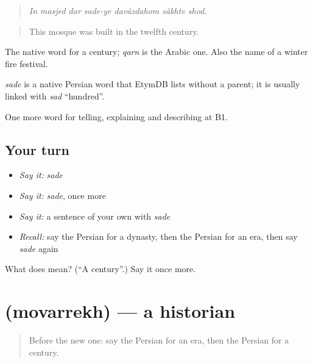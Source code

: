 \begin{quote}
\emph{In masjed dar sade-ye davâzdahom sâkhte shod.}
\end{quote}

\begin{quote}
This mosque was built in the twelfth century.
\end{quote}

The native word for a century; \emph{qarn} is the Arabic one. Also the name of a winter fire festival.

\begin{cousinweb}
\emph{sade} is a native Persian word that EtymDB lists without a parent; it is usually linked with \emph{sad} \textquotedblleft{}hundred\textquotedblright{}.
\end{cousinweb}

\begin{grammarlens}[title={What you've built}]
One more word for telling, explaining and describing at B1.
\end{grammarlens}

\subsection*{Your turn}
\begin{itemize}
\raggedright
  \item \emph{Say it:} \emph{sade}
  \item \emph{Say it:} \emph{sade}, once more
  \item \emph{Say it:} a sentence of your own with \emph{sade}
  \item \emph{Recall:} say the Persian for a dynasty, then the Persian for an era, then say \emph{sade} again
\end{itemize}

\begin{tcolorbox}[breakable,colback=teal!4,colframe=teal!35!black,title={Before you move on}]
What does  mean? (\textquotedblleft{}A century\textquotedblright{}.) Say it once more.
\end{tcolorbox}
\section[\texorpdfstring{\fa{مورخ} (movarrekh)}{مورخ (movarrekh)}]{ (movarrekh) — a historian}

\label{lesson:FA-C353-movarrekh}



\begin{quote}
Before the new one: say the Persian for an era, then the Persian for a century.
\end{quote}

